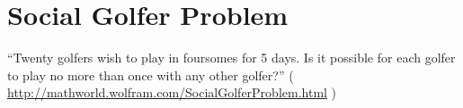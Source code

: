 \chapter{Social Golfer Problem}

``Twenty golfers wish to play in foursomes for 5 days. Is it possible for each golfer to play no more than once with any other golfer?''
( \url{http://mathworld.wolfram.com/SocialGolferProblem.html} )




